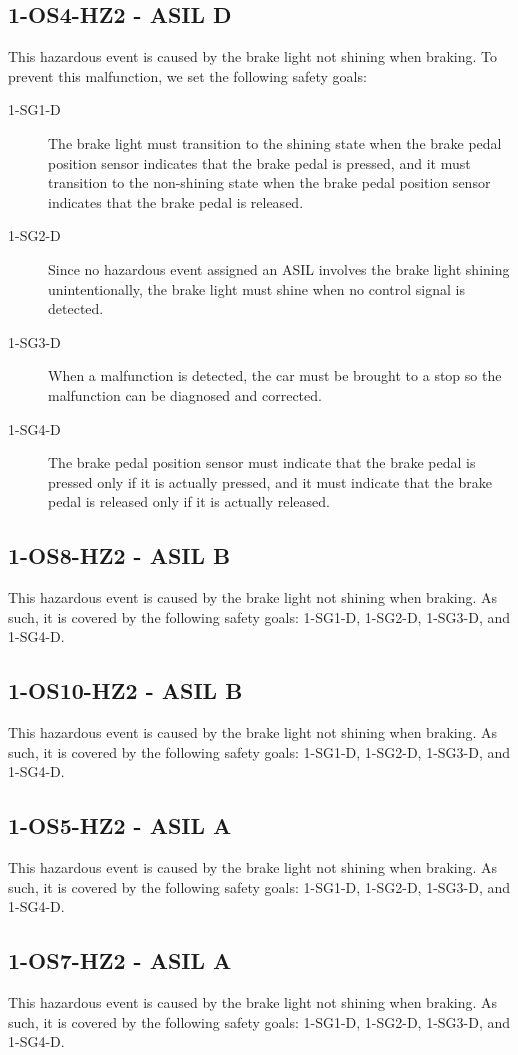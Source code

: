 \subsection{1-OS4-HZ2 - ASIL D}
This hazardous event is caused by the brake light not shining when braking.
To prevent this malfunction, we set the following safety goals:
\begin{description}
\item [1-SG1-D] The brake light must transition to the shining state when the brake pedal position sensor indicates that the brake pedal is pressed, and it must transition to the non-shining state when the brake pedal position sensor indicates that the brake pedal is released.
\item [1-SG2-D] Since no hazardous event assigned an ASIL involves the brake light shining unintentionally, the brake light must shine when no control signal is detected.
\item [1-SG3-D] When a malfunction is detected, the car must be brought to a stop so the malfunction can be diagnosed and corrected.
\item [1-SG4-D] The brake pedal position sensor must indicate that the brake pedal is pressed only if it is actually pressed, and it must indicate that the brake pedal is released only if it is actually released.
\end{description}

\subsection{1-OS8-HZ2 - ASIL B}
This hazardous event is caused by the brake light not shining when braking.
As such, it is covered by the following safety goals: 1-SG1-D, 1-SG2-D, 1-SG3-D, and 1-SG4-D.

\subsection{1-OS10-HZ2 - ASIL B}
This hazardous event is caused by the brake light not shining when braking.
As such, it is covered by the following safety goals: 1-SG1-D, 1-SG2-D, 1-SG3-D, and 1-SG4-D.

\subsection{1-OS5-HZ2 - ASIL A}
This hazardous event is caused by the brake light not shining when braking.
As such, it is covered by the following safety goals: 1-SG1-D, 1-SG2-D, 1-SG3-D, and 1-SG4-D.

\subsection{1-OS7-HZ2 - ASIL A}
This hazardous event is caused by the brake light not shining when braking.
As such, it is covered by the following safety goals: 1-SG1-D, 1-SG2-D, 1-SG3-D, and 1-SG4-D.
